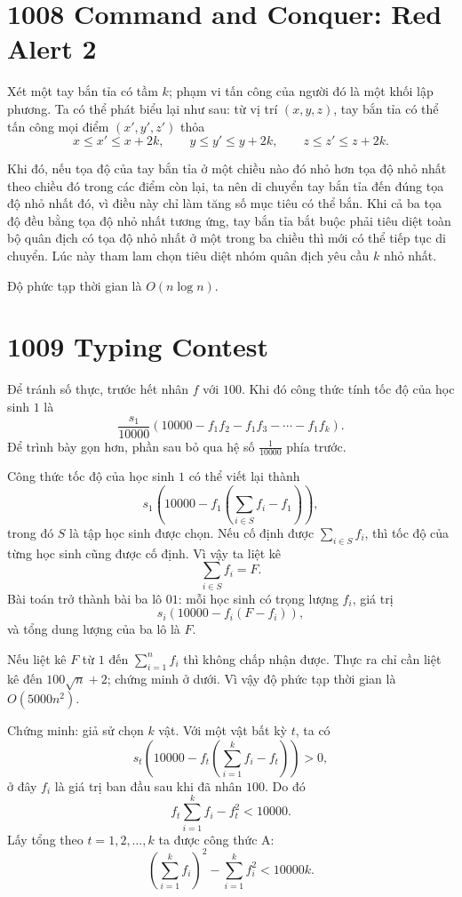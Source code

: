 \documentclass[11pt]{article}
\begin{document}
\section{1008 Command and Conquer: Red Alert 2}

Xét một tay bắn tỉa có tầm $k$; phạm vi tấn công của người đó là một khối lập
phương. Ta có thể phát biểu lại như sau: từ vị trí $(x,y,z)$, tay bắn tỉa có
thể tấn công mọi điểm $(x',y',z')$ thỏa
\[
  x\le x'\le x+2k,\qquad
  y\le y'\le y+2k,\qquad
  z\le z'\le z+2k.
\]

Khi đó, nếu tọa độ của tay bắn tỉa ở một chiều nào đó nhỏ hơn tọa độ nhỏ nhất
theo chiều đó trong các điểm còn lại, ta nên di chuyển tay bắn tỉa đến đúng
tọa độ nhỏ nhất đó, vì điều này chỉ làm tăng số mục tiêu có thể bắn. Khi cả
ba tọa độ đều bằng tọa độ nhỏ nhất tương ứng, tay bắn tỉa bắt buộc phải tiêu
diệt toàn bộ quân địch có tọa độ nhỏ nhất ở một trong ba chiều thì mới có thể
tiếp tục di chuyển. Lúc này tham lam chọn tiêu diệt nhóm quân địch yêu cầu
$k$ nhỏ nhất.

Độ phức tạp thời gian là $O(n\log n)$.

\section{1009 Typing Contest}

Để tránh số thực, trước hết nhân $f$ với $100$. Khi đó công thức tính tốc độ
của học sinh $1$ là
\[
  \frac{s_1}{10000}\left(10000-f_1f_2-f_1f_3-\cdots-f_1f_k\right).
\]
Để trình bày gọn hơn, phần sau bỏ qua hệ số $\frac{1}{10000}$ phía trước.

Công thức tốc độ của học sinh $1$ có thể viết lại thành
\[
  s_1\left(10000-f_1\left(\sum_{i\in S} f_i-f_1\right)\right),
\]
trong đó $S$ là tập học sinh được chọn. Nếu cố định được
$\sum_{i\in S} f_i$, thì tốc độ của từng học sinh cũng được cố định. Vì vậy
ta liệt kê
\[
  \sum_{i\in S} f_i=F.
\]
Bài toán trở thành bài ba lô $01$: mỗi học sinh có trọng lượng $f_i$, giá trị
\[
  s_i\left(10000-f_i(F-f_i)\right),
\]
và tổng dung lượng của ba lô là $F$.

Nếu liệt kê $F$ từ $1$ đến $\sum_{i=1}^{n} f_i$ thì không chấp nhận được.
Thực ra chỉ cần liệt kê đến $100\sqrt n+2$; chứng minh ở dưới. Vì vậy độ
phức tạp thời gian là $O(5000n^2)$.

Chứng minh: giả sử chọn $k$ vật. Với một vật bất kỳ $t$, ta có
\[
  s_t\left(10000-f_t\left(\sum_{i=1}^{k}f_i-f_t\right)\right)>0,
\]
ở đây $f_i$ là giá trị ban đầu sau khi đã nhân $100$. Do đó
\[
  f_t\sum_{i=1}^{k}f_i-f_t^2<10000.
\]
Lấy tổng theo $t=1,2,\ldots,k$ ta được công thức A:
\[
  \left(\sum_{i=1}^{k}f_i\right)^2-\sum_{i=1}^{k}f_i^2<10000k.
\]
\end{document}
